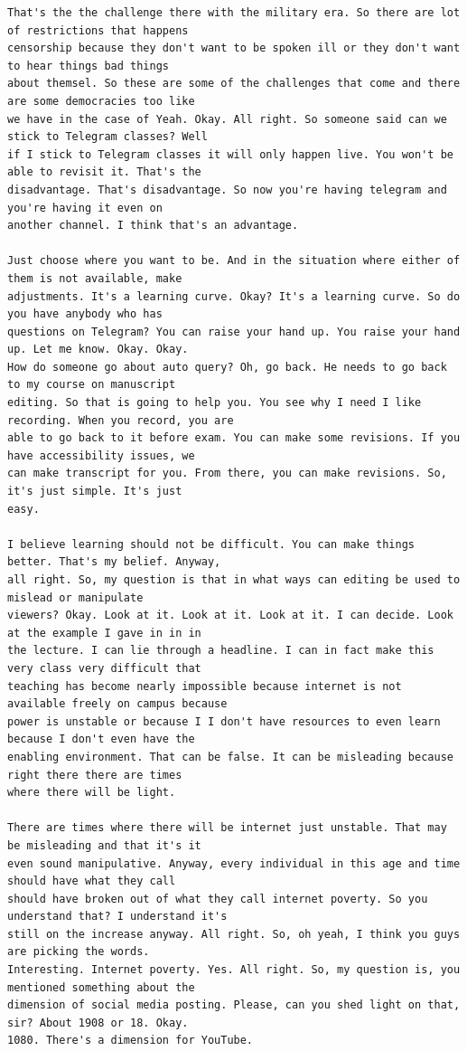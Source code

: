 {\begin{Verbatim}
That's the the challenge there with the military era. So there are lot of restrictions that happens
censorship because they don't want to be spoken ill or they don't want to hear things bad things
about themsel. So these are some of the challenges that come and there are some democracies too like
we have in the case of Yeah. Okay. All right. So someone said can we stick to Telegram classes? Well
if I stick to Telegram classes it will only happen live. You won't be able to revisit it. That's the
disadvantage. That's disadvantage. So now you're having telegram and you're having it even on
another channel. I think that's an advantage.

Just choose where you want to be. And in the situation where either of them is not available, make
adjustments. It's a learning curve. Okay? It's a learning curve. So do you have anybody who has
questions on Telegram? You can raise your hand up. You raise your hand up. Let me know. Okay. Okay.
How do someone go about auto query? Oh, go back. He needs to go back to my course on manuscript
editing. So that is going to help you. You see why I need I like recording. When you record, you are
able to go back to it before exam. You can make some revisions. If you have accessibility issues, we
can make transcript for you. From there, you can make revisions. So, it's just simple. It's just
easy.

I believe learning should not be difficult. You can make things better. That's my belief. Anyway,
all right. So, my question is that in what ways can editing be used to mislead or manipulate
viewers? Okay. Look at it. Look at it. Look at it. I can decide. Look at the example I gave in in in
the lecture. I can lie through a headline. I can in fact make this very class very difficult that
teaching has become nearly impossible because internet is not available freely on campus because
power is unstable or because I I don't have resources to even learn because I don't even have the
enabling environment. That can be false. It can be misleading because right there there are times
where there will be light.

There are times where there will be internet just unstable. That may be misleading and that it's it
even sound manipulative. Anyway, every individual in this age and time should have what they call
should have broken out of what they call internet poverty. So you understand that? I understand it's
still on the increase anyway. All right. So, oh yeah, I think you guys are picking the words.
Interesting. Internet poverty. Yes. All right. So, my question is, you mentioned something about the
dimension of social media posting. Please, can you shed light on that, sir? About 1908 or 18. Okay.
1080. There's a dimension for YouTube.


\end{Verbatim}}
